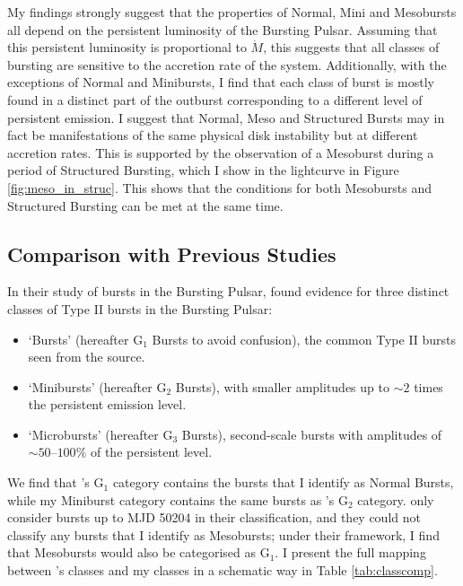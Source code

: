 \par My findings strongly suggest that the properties of Normal, Mini and Mesobursts all depend on the persistent luminosity of the Bursting Pulsar.  Assuming that this persistent luminosity is proportional to $\dot{M}$, this suggests that all classes of bursting are sensitive to the accretion rate of the system.  Additionally, with the exceptions of Normal and Minibursts, I find that each class of burst is mostly found in a distinct part of the outburst corresponding to a different level of persistent emission.  I suggest that Normal, Meso and Structured Bursts may in fact be manifestations of the same physical disk instability but at different accretion rates.  This is supported by the observation of a Mesoburst during a period of Structured Bursting, which I show in the lightcurve in Figure \ref{fig:meso_in_struc}.  This shows that the conditions for both Mesobursts and Structured Bursting can be met at the same time.

\subsection{Comparison with Previous Studies}

\par In their study of bursts in the Bursting Pulsar, \citet{Giles_BP} found evidence for three distinct classes of Type II bursts in the Bursting Pulsar:

\begin{itemize}
\item `Bursts' (hereafter G$_1$ Bursts to avoid confusion), the common Type II bursts seen from the source.
\item `Minibursts' (hereafter G$_2$  Bursts), with smaller amplitudes up to $\sim2$ times the persistent emission level.
\item `Microbursts' (hereafter G$_3$  Bursts), second-scale bursts with amplitudes of $\sim50$--$100\%$ of the persistent level.
\end{itemize}

We find that \citeauthor{Giles_BP}'s G$_1$ category contains the bursts that I identify as Normal Bursts, while my Miniburst category contains the same bursts as \citeauthor{Giles_BP}'s G$_2$ category.  \citeauthor{Giles_BP} only consider bursts up to MJD 50204 in their classification, and they could not classify any bursts that I identify as Mesobursts; under their framework, I find that Mesobursts would also be categorised as G$_1$.  I present the full mapping between \citeauthor{Giles_BP}'s classes and my classes in a schematic way in Table \ref{tab:classcomp}.

